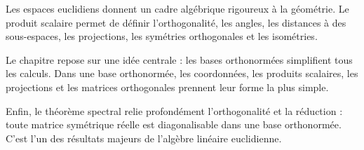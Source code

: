 \documentclass[11pt,a4paper]{article}
\begin{document}
Les espaces euclidiens donnent un cadre algébrique rigoureux à la géométrie.  
Le produit scalaire permet de définir l'orthogonalité, les angles, les distances à des sous-espaces, les projections, les symétries orthogonales et les isométries.

Le chapitre repose sur une idée centrale : les bases orthonormées simplifient tous les calculs.  
Dans une base orthonormée, les coordonnées, les produits scalaires, les projections et les matrices orthogonales prennent leur forme la plus simple.

Enfin, le théorème spectral relie profondément l'orthogonalité et la réduction : toute matrice symétrique réelle est diagonalisable dans une base orthonormée.  
C'est l'un des résultats majeurs de l'algèbre linéaire euclidienne.
\end{document}
